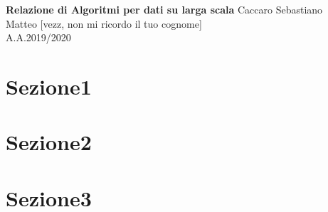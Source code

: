 \documentclass[a4paper,12pt]{article}
\begin{document}
\begin{titlepage}
\begin{center}
	\Large{\textbf{Relazione  di Algoritmi per dati su larga scala}}
\vfill
\normalsize{Caccaro Sebastiano}\\
\normalsize{Matteo [vezz, non mi ricordo il tuo cognome]}\\
\normalsize{A.A.2019/2020}
\end{center}
\end{titlepage}
\tableofcontents

\clearpage

\section{Sezione1}
\section{Sezione2}
\section{Sezione3}
\end{document}

